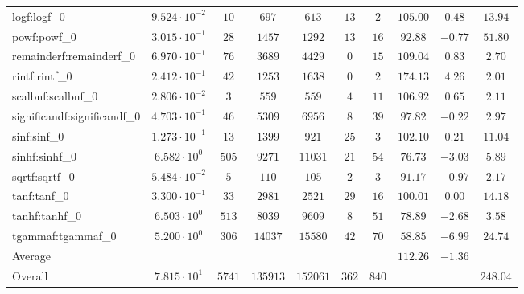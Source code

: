 \begin{tabular}{|l|c|c|c|c|c|c|c|c|c|}
logf:logf\_0                 & $ 9.524 \cdot 10^{-2} $ & $ 10     $ & $ 697    $ & $ 613    $ & $ 13  $ & $ 2   $ & $ 105.00      $ & $ 0.48    $ & $ 13.94   $ \\
powf:powf\_0                 & $ 3.015 \cdot 10^{-1} $ & $ 28     $ & $ 1457   $ & $ 1292   $ & $ 13  $ & $ 16  $ & $ 92.88       $ & $ -0.77   $ & $ 51.80   $ \\
remainderf:remainderf\_0     & $ 6.970 \cdot 10^{-1} $ & $ 76     $ & $ 3689   $ & $ 4429   $ & $ 0   $ & $ 15  $ & $ 109.04      $ & $ 0.83    $ & $ 2.70    $ \\
rintf:rintf\_0               & $ 2.412 \cdot 10^{-1} $ & $ 42     $ & $ 1253   $ & $ 1638   $ & $ 0   $ & $ 2   $ & $ 174.13      $ & $ 4.26    $ & $ 2.01    $ \\
scalbnf:scalbnf\_0           & $ 2.806 \cdot 10^{-2} $ & $ 3      $ & $ 559    $ & $ 559    $ & $ 4   $ & $ 11  $ & $ 106.92      $ & $ 0.65    $ & $ 2.11    $ \\
significandf:significandf\_0 & $ 4.703 \cdot 10^{-1} $ & $ 46     $ & $ 5309   $ & $ 6956   $ & $ 8   $ & $ 39  $ & $ 97.82       $ & $ -0.22   $ & $ 2.97    $ \\
sinf:sinf\_0                 & $ 1.273 \cdot 10^{-1} $ & $ 13     $ & $ 1399   $ & $ 921    $ & $ 25  $ & $ 3   $ & $ 102.10      $ & $ 0.21    $ & $ 11.04   $ \\
sinhf:sinhf\_0               & $ 6.582 \cdot 10^{0}  $ & $ 505    $ & $ 9271   $ & $ 11031  $ & $ 21  $ & $ 54  $ & $ 76.73       $ & $ -3.03   $ & $ 5.89    $ \\
sqrtf:sqrtf\_0               & $ 5.484 \cdot 10^{-2} $ & $ 5      $ & $ 110    $ & $ 105    $ & $ 2   $ & $ 3   $ & $ 91.17       $ & $ -0.97   $ & $ 2.17    $ \\
tanf:tanf\_0                 & $ 3.300 \cdot 10^{-1} $ & $ 33     $ & $ 2981   $ & $ 2521   $ & $ 29  $ & $ 16  $ & $ 100.01      $ & $ 0.00    $ & $ 14.18   $ \\
tanhf:tanhf\_0               & $ 6.503 \cdot 10^{0}  $ & $ 513    $ & $ 8039   $ & $ 9609   $ & $ 8   $ & $ 51  $ & $ 78.89       $ & $ -2.68   $ & $ 3.58    $ \\
tgammaf:tgammaf\_0           & $ 5.200 \cdot 10^{0}  $ & $ 306    $ & $ 14037  $ & $ 15580  $ & $ 42  $ & $ 70  $ & $ 58.85       $ & $ -6.99   $ & $ 24.74   $ \\
\hline
Average                      & $                     $ & $        $ & $        $ & $        $ & $     $ & $     $ & $ 112.26      $ & $ -1.36   $ & $         $ \\
\hline
Overall                      & $ 7.815 \cdot 10^{1}  $ & $ 5741   $ & $ 135913 $ & $ 152061 $ & $ 362 $ & $ 840 $ & $             $ & $         $ & $ 248.04  $ \\
\hline
\end{tabular}

